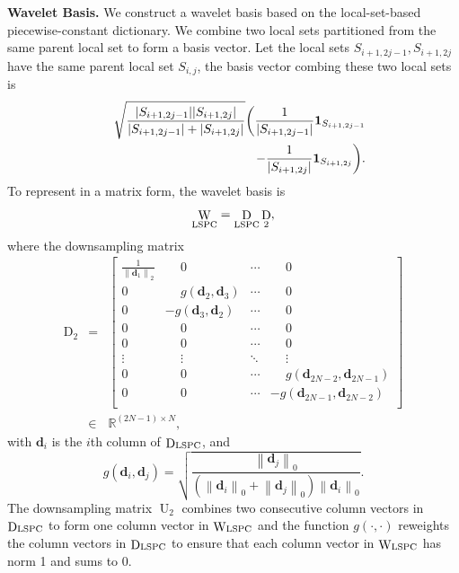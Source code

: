 \documentclass[journal,twocolumn,10pt]{IEEEtran}
\theoremstyle{definition}
\newcommand{\mypar}[1]{{\bf #1.}}
\newcommand{\R}{\ensuremath{\mathbb{R}}}
\def\d{\mathbf{d}}
\DeclareMathOperator{\D}{D}
\DeclareMathOperator{\Um}{U}
\DeclareMathOperator{\W}{W}
\begin{document}
\mypar{Wavelet Basis}
We construct a wavelet basis based on the local-set-based piecewise-constant dictionary. We combine two local sets partitioned from the same parent local set to form a basis vector. Let the local sets $S_{i+1,2j-1}, S_{i+1,2j}$ have the same parent local set $S_{i,j}$, the basis vector combing these two local sets is
\begin{eqnarray*}
&& \sqrt{ \frac{|S_{i+1,2j-1}| |S_{i+1,2j}|}{|S_{i+1,2j-1}|+|S_{i+1,2j}|}} \bigg(  \frac{1}{|S_{i+1,2j-1}|} {\bf 1}_{S_{i+1,2j-1}} 
\\
&& - \frac{1}{|S_{i+1,2j}|} {\bf 1}_{S_{i+1,2j}} \bigg).
\end{eqnarray*}
To represent in a matrix form, the wavelet basis is
\begin{eqnarray*}
\W_{\rm LSPC} = \D_{\rm LSPC} \D_2,
\end{eqnarray*}
where the downsampling matrix
\begin{eqnarray*}
 \D_2 & = &
 \begin{bmatrix}
 \frac{1}{\left\| \d_1 \right\|_2} & \phantom{+}0  & \cdots & \phantom{+}0 \\
 0 & \phantom{+} g(\d_2, \d_3)  & \cdots & \phantom{+}0 \\
 0 & -g(\d_3, \d_2)  & \cdots & \phantom{+}0 \\
  0 & \phantom{+}0 & \cdots & \phantom{+}0 \\
 0 & \phantom{+}0   & \cdots & \phantom{+}0 \\
 \vdots & \phantom{+}\vdots & \ddots & \phantom{+}\vdots \\
  0 & \phantom{+}0  & \cdots & \phantom{+}g(\d_{2N-2}, \d_{2N-1} )  \\
 0 & \phantom{+}0  & \cdots & -g(\d_{2N-1}, \d_{2N-2}) \\
 \end{bmatrix}
 \\
 & \in  & \R^{(2N-1) \times N},
\end{eqnarray*}
with $\d_i$ is the $i$th column of $\D_{\rm LSPC}$, and 
 $$
 g(\d_i, \d_j) = \sqrt{ \frac{\left\| \d_j \right\|_0} { ( \left\| \d_i \right\|_0  + \left\| \d_j \right\|_0 ) \left\| \d_i \right\|_0  }}.
 $$
The downsampling matrix $\Um_2$ combines two consecutive column vectors in $\D_{\rm LSPC}$ to form one column vector in $\W_{\rm LSPC}$ and the function $g(\cdot, \cdot)$ reweights the column vectors in $\D_{\rm LSPC}$ to ensure that each column vector in $\W_{\rm LSPC}$ has norm 1 and sums to 0. 
\end{document}
